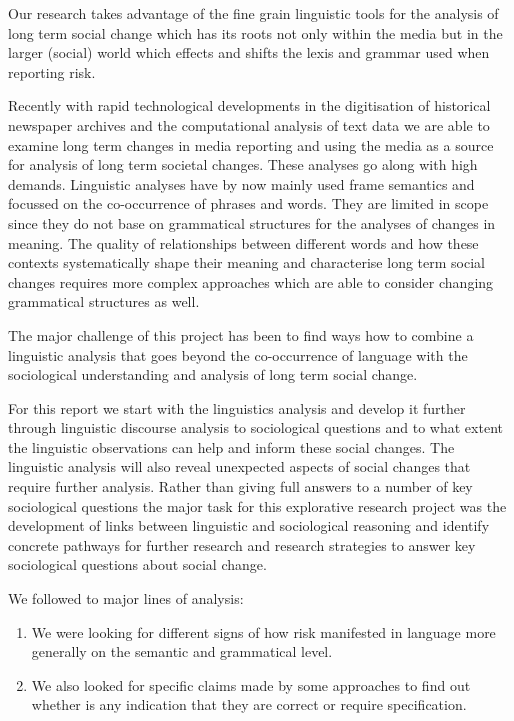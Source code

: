 Our research takes advantage of the fine grain linguistic tools for the analysis of long term social change which has its roots not only within the media but in the larger (social) world which effects and shifts the lexis and grammar used when reporting risk.

Recently with rapid technological developments in the digitisation of historical newspaper archives and the computational analysis of text data we are able to examine long term changes in media reporting and using the media as a source for analysis of long term societal changes.
These analyses go along with high demands. Linguistic analyses have by now mainly used frame semantics and focussed on the co-occurrence of phrases and words. They are limited in scope since they do not base on grammatical structures for the analyses of changes in meaning. The quality of relationships between different words and how these contexts systematically shape their meaning and characterise long term social changes requires more complex approaches which are able to consider changing grammatical structures as well.

The major challenge of this project has been to find ways how to combine a linguistic analysis that goes beyond the co-occurrence of language with the sociological understanding and analysis of long term social change. 

For this report we start with the linguistics analysis and develop it further through linguistic discourse analysis to sociological questions and to what extent the linguistic observations can help and inform these social changes. The linguistic analysis will also reveal unexpected aspects of social changes that require further analysis. Rather than giving full answers to a number of key sociological questions the major task for this explorative research project was the development of links between linguistic and sociological reasoning and identify concrete pathways for further research and research strategies to answer key sociological questions about social change.

We followed to major lines of analysis:

\begin{enumerate}
\item We were looking for different signs of how risk manifested in language more generally on the semantic and grammatical level. 
\item We also looked for specific claims made by some approaches to find out whether is any indication that they are correct or require specification. 
\end{enumerate}

